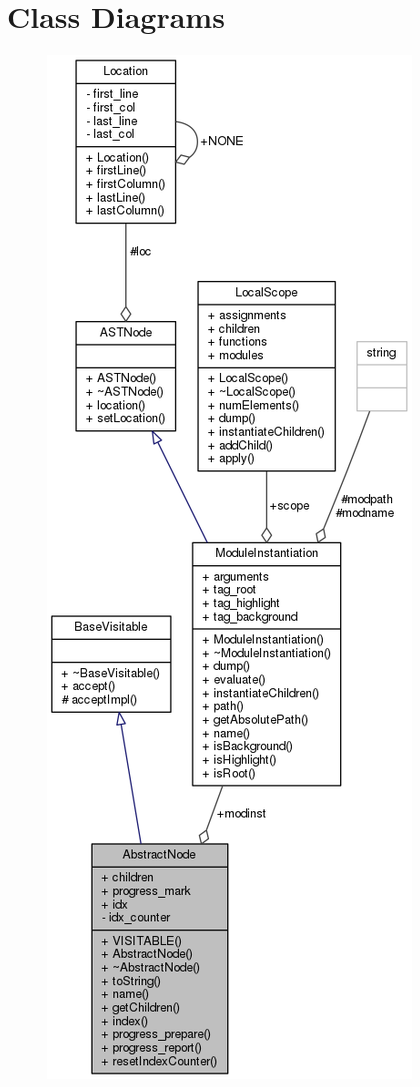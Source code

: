 \section{Class Diagrams}

\begin{figure}
\centering
\includegraphics[width=0.5\linewidth]{images/classAbstractNode__coll__graph}
\caption{}
\label{fig:classabstractnodecollgraph}
\end{figure}

